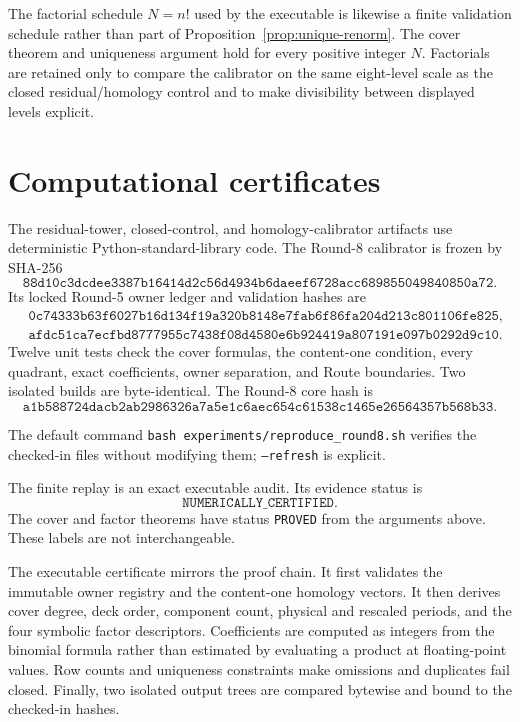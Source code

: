 \documentclass[11pt]{article}
\theoremstyle{definition}
\theoremstyle{remark}
\begin{document}
The factorial schedule $N=n!$ used by the executable is likewise a finite validation schedule rather than part of Proposition~\ref{prop:unique-renorm}. The cover theorem and uniqueness argument hold for every positive integer $N$. Factorials are retained only to compare the calibrator on the same eight-level scale as the closed residual/homology control and to make divisibility between displayed levels explicit.

\section{Computational certificates}

The residual-tower, closed-control, and homology-calibrator artifacts use deterministic Python-standard-library code. The Round-8 calibrator is frozen by SHA-256
\[
\texttt{88d10c3dcdee3387b16414d2c56d4934b6daeef6728acc689855049840850a72}.
\]
Its locked Round-5 owner ledger and validation hashes are
\begin{align*}
&\texttt{0c74333b63f6027b16d134f19a320b8148e7fab6f86fa204d213c801106fe825},\\
&\texttt{afdc51ca7ecfbd8777955c7438f08d4580e6b924419a807191e097b0292d9c10}.
\end{align*}
Twelve unit tests check the cover formulas, the content-one condition, every quadrant, exact coefficients, owner separation, and Route boundaries. Two isolated builds are byte-identical. The Round-8 core hash is
\[
\texttt{a1b588724dacb2ab2986326a7a5e1c6aec654c61538c1465e26564357b568b33}.
\]

The default command \texttt{bash experiments/reproduce\_round8.sh} verifies the checked-in files without modifying them; \texttt{--refresh} is explicit.

The finite replay is an exact executable audit. Its evidence status is
\[
\texttt{NUMERICALLY\_CERTIFIED}.
\]
The cover and factor theorems have status \texttt{PROVED} from the arguments above. These labels are not interchangeable.

The executable certificate mirrors the proof chain. It first validates the immutable owner registry and the content-one homology vectors. It then derives cover degree, deck order, component count, physical and rescaled periods, and the four symbolic factor descriptors. Coefficients are computed as integers from the binomial formula rather than estimated by evaluating a product at floating-point values. Row counts and uniqueness constraints make omissions and duplicates fail closed. Finally, two isolated output trees are compared bytewise and bound to the checked-in hashes.
\end{document}
